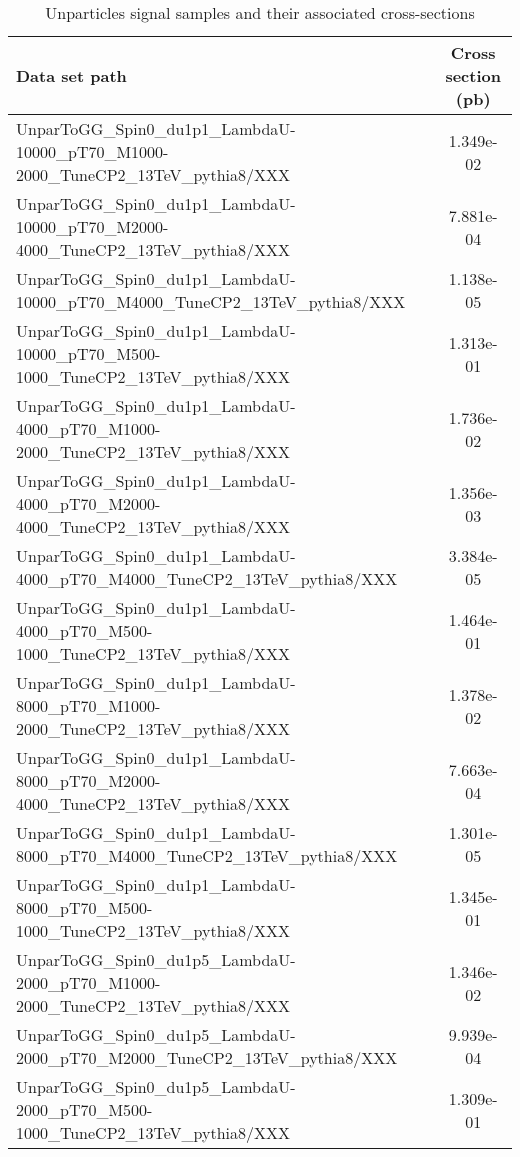 \begin{landscape}
\begin{table}[!htbp]
       \caption{ Unparticles signal samples and their associated cross-sections }
       \centering
       \vspace{\baselineskip}
       \begin{tabular}{lc}
       \hline \hline
       Data set path & Cross section (pb)\\
       \hline

       UnparToGG\_Spin0\_du1p1\_LambdaU-10000\_pT70\_M1000-2000\_TuneCP2\_13TeV\_pythia8/XXX & 1.349e-02\\
       UnparToGG\_Spin0\_du1p1\_LambdaU-10000\_pT70\_M2000-4000\_TuneCP2\_13TeV\_pythia8/XXX & 7.881e-04\\
       UnparToGG\_Spin0\_du1p1\_LambdaU-10000\_pT70\_M4000\_TuneCP2\_13TeV\_pythia8/XXX & 1.138e-05\\
       UnparToGG\_Spin0\_du1p1\_LambdaU-10000\_pT70\_M500-1000\_TuneCP2\_13TeV\_pythia8/XXX & 1.313e-01\\
       UnparToGG\_Spin0\_du1p1\_LambdaU-4000\_pT70\_M1000-2000\_TuneCP2\_13TeV\_pythia8/XXX & 1.736e-02\\
       UnparToGG\_Spin0\_du1p1\_LambdaU-4000\_pT70\_M2000-4000\_TuneCP2\_13TeV\_pythia8/XXX & 1.356e-03\\
       UnparToGG\_Spin0\_du1p1\_LambdaU-4000\_pT70\_M4000\_TuneCP2\_13TeV\_pythia8/XXX & 3.384e-05\\
       UnparToGG\_Spin0\_du1p1\_LambdaU-4000\_pT70\_M500-1000\_TuneCP2\_13TeV\_pythia8/XXX & 1.464e-01\\
       UnparToGG\_Spin0\_du1p1\_LambdaU-8000\_pT70\_M1000-2000\_TuneCP2\_13TeV\_pythia8/XXX & 1.378e-02\\
       UnparToGG\_Spin0\_du1p1\_LambdaU-8000\_pT70\_M2000-4000\_TuneCP2\_13TeV\_pythia8/XXX & 7.663e-04\\
       UnparToGG\_Spin0\_du1p1\_LambdaU-8000\_pT70\_M4000\_TuneCP2\_13TeV\_pythia8/XXX & 1.301e-05\\
       UnparToGG\_Spin0\_du1p1\_LambdaU-8000\_pT70\_M500-1000\_TuneCP2\_13TeV\_pythia8/XXX & 1.345e-01\\
       UnparToGG\_Spin0\_du1p5\_LambdaU-2000\_pT70\_M1000-2000\_TuneCP2\_13TeV\_pythia8/XXX & 1.346e-02\\
       UnparToGG\_Spin0\_du1p5\_LambdaU-2000\_pT70\_M2000\_TuneCP2\_13TeV\_pythia8/XXX & 9.939e-04\\
       UnparToGG\_Spin0\_du1p5\_LambdaU-2000\_pT70\_M500-1000\_TuneCP2\_13TeV\_pythia8/XXX & 1.309e-01\\

\end{tabular}
\end{table}
\end{landscape}
